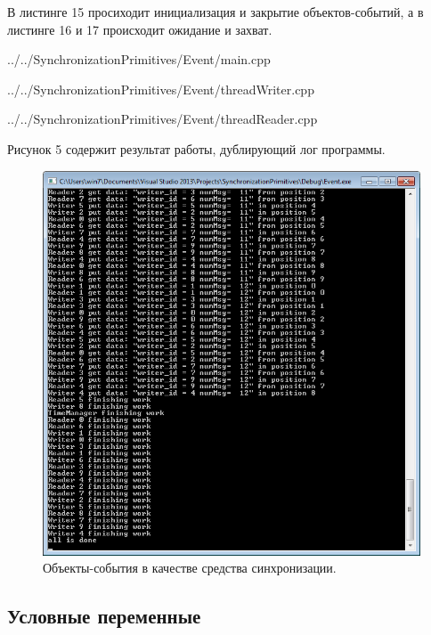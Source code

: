 \documentclass[a4paper, 12pt]{article}		%
\begin{document}
В листинге 15 просиходит инициализация и закрытие объектов-событий, а в листинге 16 и 17 происходит ожидание и захват.


{../../SynchronizationPrimitives/Event/main.cpp}


{../../SynchronizationPrimitives/Event/threadWriter.cpp}


{../../SynchronizationPrimitives/Event/threadReader.cpp}

Рисунок 5 содержит результат работы, дублирующий лог программы.

\begin{figure}[h!]
\centering
\includegraphics[scale=1]{res/004}
\caption{Объекты-события в качестве средства синхронизации.}
\end{figure}

\newpage
\subsection{Условные переменные}
\end{document}
